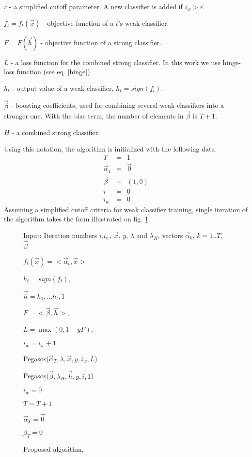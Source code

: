 \documentclass[10pt,twocolumn, a4paper]{article}
\begin{document}
$r$ - a simplified cutoff parameter. A new classifier is added if $i_w>r$.

$f_t=f_t(\vec{x})$ - objective function of a $t$'s weak classifier.

$F=F(\vec{h})$ - objective function of a strong classifier.

$L$ - a loss function for the combined strong classifier. In this work we use hinge-loss function (see eq. \ref{hinge}).

$h_t$ - output value of a weak classifier, $h_t=sign(f_t)$.

$\vec{\beta}$ - boosting coefficients, used for combining several weak classifiers into a stronger one. With the bias term, the number of elements in $\vec{\beta}$ is $T+1$.

$H$ - a combined strong classifier. 

Using this notation, the algorithm is initialized with the following data:
$$
\begin{array}{rcr}
\label{init}
T &=& 1 \\
\vec{\alpha}_1&=&\vec{0} \\
\vec{\beta}&=&(1,0) \\
i &=& 0\\
i_w &=& 0
\end{array}
$$
Assuming a simplified cutoff criteria for weak classifier training,  single iteration of the algorithm takes the form illustrated on fig. \ref{Ours}.

\begin{figure}[ht]

Input: Iteration numbers $i$,$i_w$, $\vec{x}$, $y$, $\lambda$ and $\lambda_H$, vectors $\vec{\alpha}_k$, $k=1..T$, $\vec{\beta}$

\begin{algorithmic}

$f_t(\vec{x})=<\vec{\alpha}_t,\vec{x}>$

$h_t=sign(f_t)$,

\EndFor

$\vec{h}={h_1,...h_t,1}$

$F=<\vec{\beta},\vec{h}>$,

$L=\max(0,1-y{F})$,

$i_w=i_w+1$

Pegasos($\vec{\alpha}_T,\lambda,\vec{x},y,i_w,L$)

Pegasos($\vec{\beta},\lambda_H,\vec{h},y,i,1$)


$i_w=0$

$T=T+1$

$\vec{\alpha}_T=\vec{0}$

$\beta_T=0$
\EndIf
\end{algorithmic}
\caption{Proposed algorithm.}
\label{Ours}
\end{figure}
\end{document}
